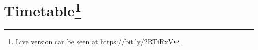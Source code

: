 \documentclass[a4paper,12pt]{article}
\begin{document}
\section*{Timetable\footnote{Live version can be seen at \url{https://bit.ly/2RTiRxV}}}

\begin{figure}[ht]
  \centering
\end{figure}

\pagebreak

\end{document}
